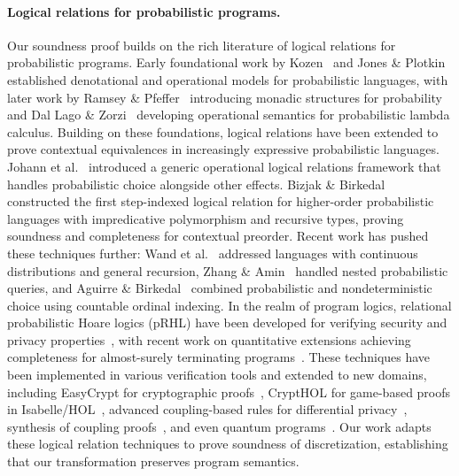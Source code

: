 \paragraph{Logical relations for probabilistic programs.}
Our soundness proof builds on the rich literature of logical relations for probabilistic programs.
Early foundational work by Kozen~\cite{Kozen1981Semantics} and Jones \& Plotkin~\cite{Jones1989Probabilistic} established denotational and operational models for probabilistic languages, with later work by Ramsey \& Pfeffer~\cite{Ramsey2002Stochastic} introducing monadic structures for probability and Dal Lago \& Zorzi~\cite{DiLago2012Probabilistic} developing operational semantics for probabilistic lambda calculus.
Building on these foundations, logical relations have been extended to prove contextual equivalences in increasingly expressive probabilistic languages.
Johann et al.~\cite{Johann2010Generic} introduced a generic operational logical relations framework that handles probabilistic choice alongside other effects.
Bizjak \& Birkedal~\cite{Bizjak2015Step} constructed the first step-indexed logical relation for higher-order probabilistic languages with impredicative polymorphism and recursive types, proving soundness and completeness for contextual preorder.
Recent work has pushed these techniques further: Wand et al.~\cite{Wand2018Contextual} addressed languages with continuous distributions and general recursion, Zhang \& Amin~\cite{Zhang2022Reasoning} handled nested probabilistic queries, and Aguirre \& Birkedal~\cite{Aguirre2023Step} combined probabilistic and nondeterministic choice using countable ordinal indexing.
In the realm of program logics, relational probabilistic Hoare logics (pRHL) have been developed for verifying security and privacy properties~\cite{Barthe2009Formal,Barthe2012Privacy}, with recent work on quantitative extensions achieving completeness for almost-surely terminating programs~\cite{Avanzini2025Quantitative}.
These techniques have been implemented in various verification tools and extended to new domains, including EasyCrypt for cryptographic proofs~\cite{Barthe2011Computer}, CryptHOL for game-based proofs in Isabelle/HOL~\cite{Basin2020CryptHOL}, advanced coupling-based rules for differential privacy~\cite{Barthe2016Proving,Barthe2016Advanced}, synthesis of coupling proofs~\cite{Albarghouthi2018Synthesizing}, and even quantum programs~\cite{Barthe2020Quantum}.
Our work adapts these logical relation techniques to prove soundness of discretization, establishing that our transformation preserves program semantics.

